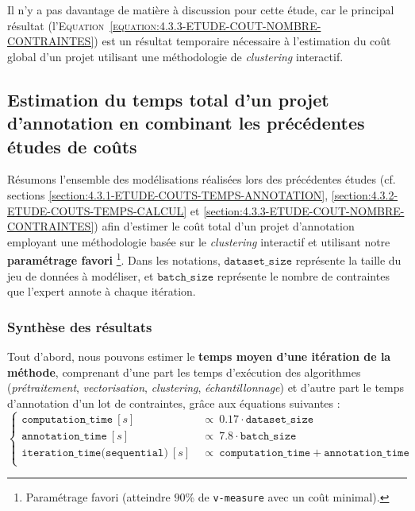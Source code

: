 			\begin{leftBarAuthorOpinion}
				Il n'y a pas davantage de matière à discussion pour cette étude, car le principal résultat (l'\textsc{Equation~\ref{equation:4.3.3-ETUDE-COUT-NOMBRE-CONTRAINTES}}) est un résultat temporaire nécessaire à l'estimation du coût global d'un projet utilisant une méthodologie de \textit{clustering} interactif.
			\end{leftBarAuthorOpinion}
	
	\subsection{Estimation du temps total d'un projet d'annotation en combinant les précédentes études de coûts}
	\label{section:4.3.4-ETUDE-COUTS-TOTAL}
	
		Résumons l'ensemble des modélisations réalisées lors des précédentes études (cf. sections \ref{section:4.3.1-ETUDE-COUTS-TEMPS-ANNOTATION}, \ref{section:4.3.2-ETUDE-COUTS-TEMPS-CALCUL} et \ref{section:4.3.3-ETUDE-COUT-NOMBRE-CONTRAINTES}) afin d'estimer le coût total d'un projet d'annotation employant une méthodologie basée sur le \textit{clustering} interactif et utilisant notre \textbf{paramétrage favori}
		\footnote{Paramétrage favori (atteindre $90$\% de \texttt{v-measure} avec un coût minimal).}.
		Dans les notations, $\texttt{dataset\_size}$ représente la taille du jeu de données à modéliser, et $\texttt{batch\_size}$ représente le nombre de contraintes que l'expert annote à chaque itération.

		\subsubsection{Synthèse des résultats}
			
			Tout d'abord, nous pouvons estimer le \textbf{temps moyen d'une itération de la méthode}, comprenant d'une part les temps d'exécution des algorithmes (\textit{prétraitement}, \textit{vectorisation}, \textit{clustering}, \textit{échantillonnage}) et d'autre part le temps d'annotation d'un lot de contraintes, grâce aux équations suivantes :
			\begin{equation}
				\label{equation:4.3.4-ETUDE-COUT-UNE-ITERATION-SEQUENTIELLE}
				\begin{cases}
					\texttt{computation\_time}~[s]&
						~\propto~0.17 \cdot \texttt{dataset\_size}\\
					\texttt{annotation\_time}~[s]&
						~\propto~7.8 \cdot \texttt{batch\_size} \\
					\texttt{iteration\_time(sequential)}~[s]&
						~\propto~\texttt{computation\_time} + \texttt{annotation\_time} \\
				\end{cases}
			\end{equation}
			
